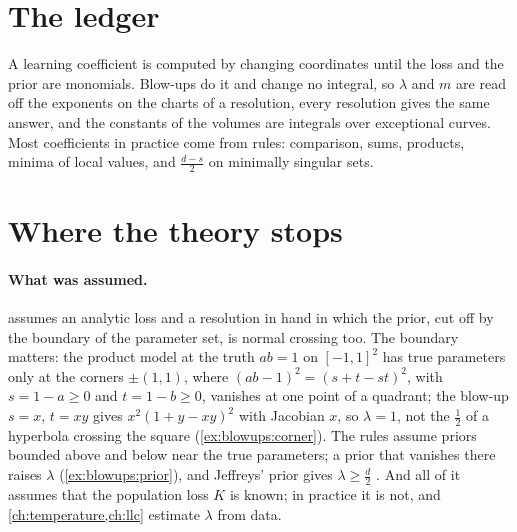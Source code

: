 \begin{refsection}
\section{The ledger}\label{sec:blowups:ledger}

A learning coefficient is computed by changing coordinates until the loss and the prior are monomials. Blow-ups do it and change no integral, so $\lambda$ and $m$ are read off the exponents on the charts of a resolution, every resolution gives the same answer, and the constants of the volumes are integrals over exceptional curves. Most coefficients in practice come from rules: comparison, sums, products, minima of local values, and $\frac{d-s}2$ on minimally singular sets.


\section{Where the theory stops}\label{sec:blowups:stops}

\paragraph{What was assumed.}  assumes an analytic loss and a resolution in hand in which the prior, cut off by the boundary of the parameter set, is normal crossing too. The boundary matters: the product model at the truth $ab=1$ on $[-1,1]^2$ has true parameters only at the corners $\pm(1,1)$, where $(ab-1)^2=(s+t-st)^2$, with $s=1-a\ge0$ and $t=1-b\ge0$, vanishes at one point of a quadrant; the blow-up $s=x$, $t=xy$ gives $x^2(1+y-xy)^2$ with Jacobian $x$, so $\lambda=1$, not the $\frac12$ of a hyperbola crossing the square (\cref{ex:blowups:corner}). The rules assume priors bounded above and below near the true parameters; a prior that vanishes there raises $\lambda$ (\cref{ex:blowups:prior}), and Jeffreys' prior gives $\lambda\ge\frac d2$ \parencite{Watanabe2024}. And all of it assumes that the population loss $K$ is known; in practice it is not, and \cref{ch:temperature,ch:llc} estimate $\lambda$ from data.


\end{refsection}
